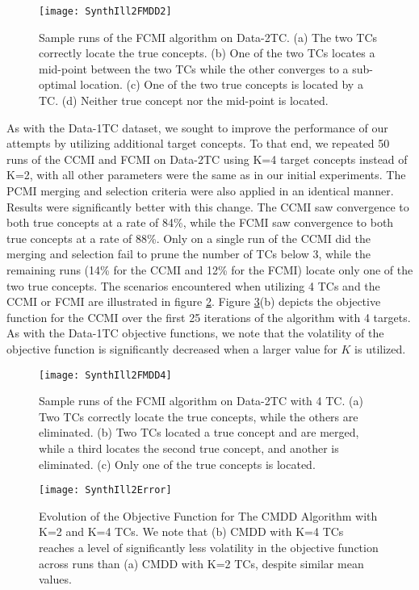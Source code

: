 \documentclass[12pt,dvips]{report}
\numberwithin{equation}{section}
\begin{document}
\begin{figure}[htb]
 \texttt{[image: SynthIll2FMDD2]}
 
\caption{Sample runs of the FCMI algorithm on Data-2TC. (a) The two TCs correctly locate the true concepts. (b) One of the two TCs locates a mid-point between the two TCs while the other converges to a sub-optimal location. (c) One of the two true concepts is located by a TC. (d) Neither true concept nor the mid-point is located.}
\label{fig:SynthIll2FMDD2}
\end{figure}

As with the Data-1TC dataset, we sought to improve the performance of our attempts by utilizing additional target concepts.  To that end, we repeated 50 runs of the CCMI and FCMI on Data-2TC using K=4 target concepts instead of K=2, with all other parameters were the same as in our initial experiments.  The PCMI merging and selection criteria were also applied in an identical manner. Results were significantly better with this change. The CCMI saw convergence to both true concepts at a rate of 84\%, while the FCMI saw convergence to both true concepts at a rate of 88\%.  Only on a single run of the CCMI did the merging and selection fail to prune the number of TCs below 3, while the remaining runs (14\% for the CCMI and 12\% for the FCMI) locate only one of the two true concepts.  The scenarios encountered when utilizing 4 TCs and the CCMI or FCMI are illustrated in figure \ref{fig:SynthIll2FMDD4}.   Figure \ref{fig:SynthIll2Error}(b) depicts the objective function for the CCMI over the first 25 iterations of the algorithm with 4 targets.  As with the Data-1TC objective functions, we note that the volatility of the objective function is significantly decreased when a larger value for $K$ is utilized.

\begin{figure}[htb]
\texttt{[image: SynthIll2FMDD4]} 

\caption{Sample runs of the FCMI algorithm on Data-2TC with 4 TC. (a) Two TCs correctly locate the true concepts, while the others are eliminated. (b) Two TCs located a true concept and are merged, while a third locates the second true concept, and another is eliminated. (c) Only one of the true concepts is located.}
\label{fig:SynthIll2FMDD4}
\end{figure} 


\begin{figure}[htb]
 \texttt{[image: SynthIll2Error]} 
\caption{Evolution of the Objective Function for The CMDD Algorithm with K=2 and K=4 TCs. We note that (b) CMDD with K=4 TCs reaches a level of significantly less volatility in the objective function across runs than (a) CMDD with K=2 TCs, despite similar mean values.}
\label{fig:SynthIll2Error}
\end{figure} 
\end{document}
